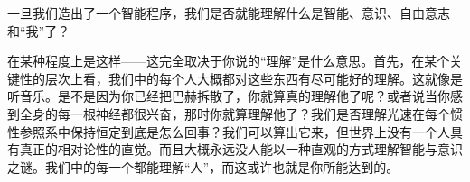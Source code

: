 \begin{description}[speculation]
\item[问题]一旦我们造出了一个智能程序，我们是否就能理解什么是智能、意识、自由意志和“我”了？
\item[推测]在某种程度上是这样——这完全取决于你说的“理解”是什么意思。首先，在某个关键性的层次上看，我们中的每个人大概都对这些东西有尽可能好的理解。这就像是听音乐。是不是因为你已经把巴赫拆散了，你就算真的理解他了呢？或者说当你感到全身的每一根神经都很兴奋，那时你就算理解他了？我们是否理解光速在每个惯性参照系中保持恒定到底是怎么回事？我们可以算出它来，但世界上没有一个人具有真正的相对论性的直觉。而且大概永远没人能以一种直观的方式理解智能与意识之谜。我们中的每一个都能理解“人”，而这或许也就是你所能达到的。
\end{description}
